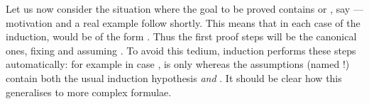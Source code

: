 \begin{isabellebody}
\begin{isamarkuptext}
Let us now consider the situation where the goal to be proved contains
\isa{{\isasymAnd}} or \isa{{\isasymLongrightarrow}}, say  --- motivation and a
real example follow shortly.  This means that in each case of the induction,
 would be of the form .  Thus the
first proof steps will be the canonical ones, fixing  and assuming
. To avoid this tedium, induction performs these steps
automatically: for example in case ,  is only
 whereas the assumptions (named !) contain both the
usual induction hypothesis \emph{and} .
It should be clear how this generalises to more complex formulae.


\end{isamarkuptext}
\end{isabellebody}
